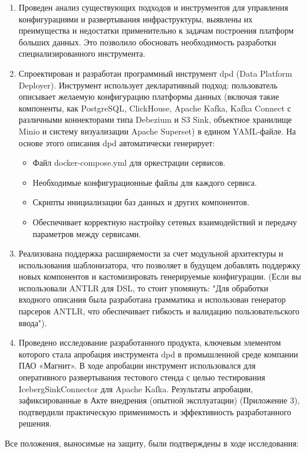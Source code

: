 \begin{enumerate}[1.]
    \item Проведен анализ существующих подходов и инструментов для управления конфигурациями и развертывания инфраструктуры, выявлены их преимущества и недостатки применительно к задачам построения платформ больших данных. Это позволило обосновать необходимость разработки специализированного инструмента.
    \item Спроектирован и разработан программный инструмент dpd (Data Platform Deployer). Инструмент использует декларативный подход: пользователь описывает желаемую конфигурацию платформы данных (включая такие компоненты, как PostgreSQL, ClickHouse, Apache Kafka, Kafka Connect с различными коннекторами типа Debezium и S3 Sink, объектное хранилище Minio и систему визуализации Apache Superset) в едином YAML-файле. На основе этого описания dpd автоматически генерирует:
          \begin{itemize}
              \item Файл docker-compose.yml для оркестрации сервисов.
              \item Необходимые конфигурационные файлы для каждого сервиса.
              \item Скрипты инициализации баз данных и других компонентов.
              \item Обеспечивает корректную настройку сетевых взаимодействий и передачу параметров между сервисами.
          \end{itemize}
    \item Реализована поддержка расширяемости за счет модульной архитектуры и использования шаблонизатора, что позволяет в будущем добавлять поддержку новых компонентов и кастомизировать генерируемые конфигурации. (Если вы использовали ANTLR для DSL, то стоит упомянуть: "Для обработки входного описания была разработана грамматика и использован генератор парсеров ANTLR, что обеспечивает гибкость и валидацию пользовательского ввода").
    \item Проведено исследование разработанного продукта, ключевым элементом которого стала апробация инструмента dpd в промышленной среде компании ПАО «Магнит». В ходе апробации инструмент использовался для оперативного развертывания тестового стенда с целью тестирования IcebergSinkConnector для Apache Kafka. Результаты апробации, зафиксированные в Акте внедрения (опытной эксплуатации) (Приложение 3), подтвердили практическую применимость и эффективность разработанного решения.
\end{enumerate}
Все положения, выносимые на защиту, были подтверждены в ходе исследования:

